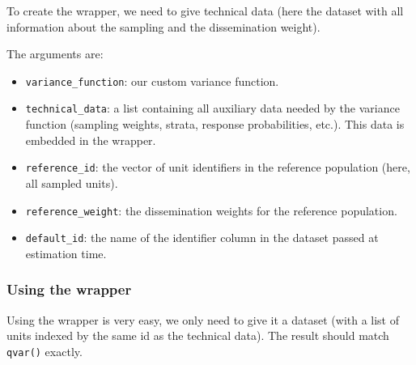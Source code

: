 \documentclass[
]{article}
\newenvironment{Shaded}{\begin{snugshade}}{\end{snugshade}}
\newcommand{\AttributeTok}[1]{\textcolor[rgb]{0.13,0.29,0.53}{#1}}
\newcommand{\FunctionTok}[1]{\textcolor[rgb]{0.13,0.29,0.53}{\textbf{#1}}}
\newcommand{\NormalTok}[1]{#1}
\newcommand{\OtherTok}[1]{\textcolor[rgb]{0.56,0.35,0.01}{#1}}
\newcommand{\SpecialCharTok}[1]{\textcolor[rgb]{0.81,0.36,0.00}{\textbf{#1}}}
\newcommand{\StringTok}[1]{\textcolor[rgb]{0.31,0.60,0.02}{#1}}
\providecommand{\tightlist}{%
  \setlength{\itemsep}{0pt}\setlength{\parskip}{0pt}}
\begin{document}
To create the wrapper, we need to give technical data (here the dataset
with all information about the sampling and the dissemination weight).

\begin{Shaded}
\end{Shaded}

The arguments are:

\begin{itemize}
\tightlist
\item
  \texttt{variance\_function}: our custom variance function.
\item
  \texttt{technical\_data}: a list containing all auxiliary data needed
  by the variance function (sampling weights, strata, response
  probabilities, etc.). This data is embedded in the wrapper.
\item
  \texttt{reference\_id}: the vector of unit identifiers in the
  reference population (here, all sampled units).
\item
  \texttt{reference\_weight}: the dissemination weights for the
  reference population.
\item
  \texttt{default\_id}: the name of the identifier column in the dataset
  passed at estimation time.
\end{itemize}

\subsubsection{Using the wrapper}\label{using-the-wrapper}

Using the wrapper is very easy, we only need to give it a dataset (with
a list of units indexed by the same id as the technical data). The
result should match \texttt{qvar()} exactly.
\end{document}
